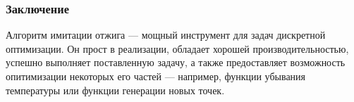 \documentclass[12pt]{beamer}
\begin{document}
\begin{frame}
\frametitle{Заключение}
Алгоритм имитации отжига --- мощный инструмент для задач дискретной оптимизации. Он прост в реализации, обладает хорошей производительностью, успешно выполняет поставленную задачу, а также предоставляет возможность опитимизации некоторых его частей --- например, функции убывания температуры или функции генерации новых точек.
\end{frame}
\end{document}
